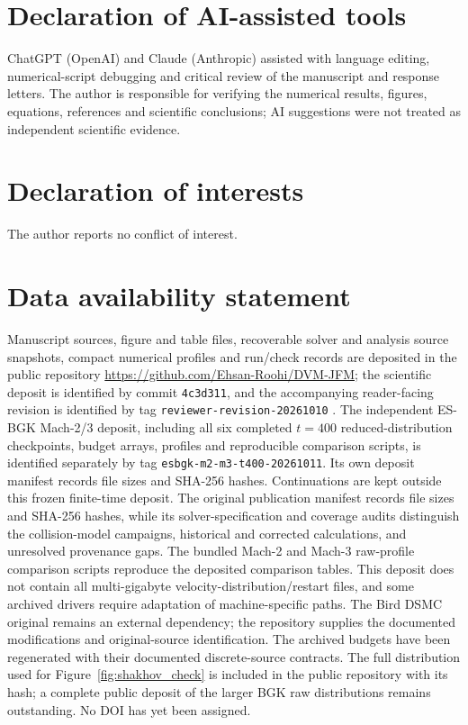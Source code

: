 \documentclass[lineno,paper]{JFM-FLM_Au}
\begin{document}
\section*{Declaration of AI-assisted tools}
ChatGPT (OpenAI) and Claude (Anthropic) assisted with language editing, numerical-script debugging and critical review of the manuscript and response letters. The author is responsible for verifying the numerical results, figures, equations, references and scientific conclusions; AI suggestions were not treated as independent scientific evidence.

\section*{Declaration of interests}
The author reports no conflict of interest.

\section*{Data availability statement}
\begingroup\raggedright
Manuscript sources, figure and table files, recoverable solver and analysis source snapshots, compact numerical profiles and run/check records are deposited in the public repository \url{https://github.com/Ehsan-Roohi/DVM-JFM}; the scientific deposit is identified by commit \texttt{4c3d311}, and the accompanying reader-facing revision is identified by tag \texttt{reviewer-revision-20261010} \citep{RoohiShockArchive2026}. The independent ES-BGK Mach-2/3 deposit, including all six completed $t=400$ reduced-distribution checkpoints, budget arrays, profiles and reproducible comparison scripts, is identified separately by tag \texttt{esbgk-m2-m3-t400-20261011}. Its own deposit manifest records file sizes and SHA-256 hashes. Continuations are kept outside this frozen finite-time deposit. The original publication manifest records file sizes and SHA-256 hashes, while its solver-specification and coverage audits distinguish the collision-model campaigns, historical and corrected calculations, and unresolved provenance gaps. The bundled Mach-2 and Mach-3 raw-profile comparison scripts reproduce the deposited comparison tables. This deposit does not contain all multi-gigabyte velocity-distribution/restart files, and some archived drivers require adaptation of machine-specific paths. The Bird DSMC original remains an external dependency; the repository supplies the documented modifications and original-source identification. The archived budgets have been regenerated with their documented discrete-source contracts. The full distribution used for Figure~\ref{fig:shakhov_check} is included in the public repository with its hash; a complete public deposit of the larger BGK raw distributions remains outstanding. No DOI has yet been assigned.\par\endgroup
\end{document}

